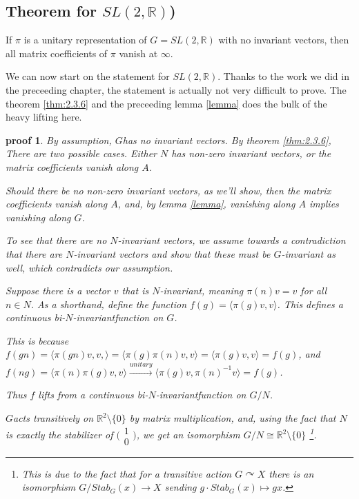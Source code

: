 \documentclass[
]{article}
\theoremstyle{break}
\theoremstyle{plain}
\newtheorem*{pf}{proof}
\newcommand{\G}{\ensuremath{G}}
\newcommand{\bbr}{\ensuremath{\mathbb{R}}}
\newcommand{\sltr}{\ensuremath{SL(2, \mathbb{R})}}
\newcommand{\Ninv}{$N$-invariant}
\newcommand{\ipmatrix}[1]{%
\ensuremath{\big(\begin{smallmatrix} #1 \end{smallmatrix}\big)}}
\begin{document}
\hypertarget{theorem-for-sl2-r}{%
  \subsection{Theorem for \texorpdfstring{$SL(2, \mathbb{R})$}{SN(2, R)})}\label{theorem-for-sl2-r}}

If $\pi$ is a unitary representation of $G = SL(2, \mathbb{R})$ with no
invariant vectors, then all matrix coefficients of $\pi$ vanish at $\infty$.


We can now start on the statement for \sltr. Thanks to the work we did in the
preceeding chapter, the statement is actually not very difficult to prove. The
theorem \ref{thm:2.3.6} and the preceeding lemma \ref{lemma} does the bulk of
the heavy lifting here.


\begin{pf}
  By assumption, \G has no invariant vectors. By theorem \ref{thm:2.3.6},
  There are two possible cases. Either $N$ has non-zero invariant vectors,
  or the matrix coefficients vanish along $A$.

  Should there be no non-zero invariant vectors, as we'll show, then
  the matrix coefficients vanish along $A$, and, by lemma \ref{lemma},
  vanishing along $A$ implies vanishing along \G.

  To see that there are no $N$-invariant vectors, we assume towards a contradiction
  that there are $N$-invariant vectors and show that these must be \G-invariant as well,
  which contradicts our assumption.

  Suppose there is a vector $v$ that is \Ninv, meaning $\pi(n)v = v$ for all $n \in N$.
  As a shorthand, define the function $f(g) = \langle \pi(g)v,v\rangle$.
  This defines a continuous bi-\Ninv function on $G$.

  This is because $f(gn) = \langle \pi(gn)v,v,\rangle = \langle \pi(g)\pi(n)v,v\rangle = \langle \pi(g)v,v\rangle = f(g)$,
  and $f(ng) = \langle \pi(n)\pi(g)v,v\rangle \xrightarrow{unitary} \langle \pi(g)v, \pi(n)^{-1}v\rangle = f(g)$.

  Thus $f$ lifts from a continuous bi-\Ninv function on $G/N$.

  \G acts transitively on $\bbr^2\setminus \{0\}$ by matrix multiplication,
  and, using the fact that $N$ is exactly the stabilizer of $\ipmatrix{1 \\
  0}$, we get an isomorphism $G/N \cong \bbr^2\setminus \{0\}$ \footnote{This
  is due to the fact that for a transitive action $G\curvearrowright X$ there
  is an isomorphism $G/Stab_G(x) \rightarrow X$ sending $g\cdot Stab_G(x)
  \mapsto gx$.}.


\end{pf}
\end{document}
